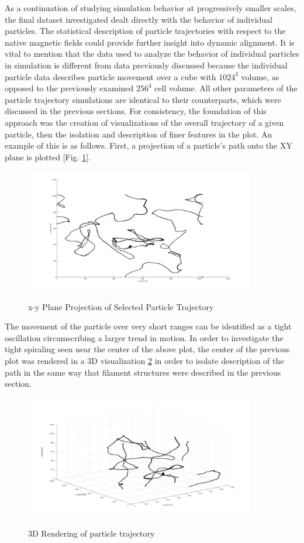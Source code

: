 \documentclass[journal, a4paper]{IEEEtran}
\begin{document}
As a continuation of studying simulation behavior at progressively smaller scales, the final dataset investigated dealt directly with the behavior of individual particles. The statistical description of particle trajectories with respect to the native magnetic fields could provide further insight into dynamic alignment. It is vital to mention that the data used to analyze the behavior of individual particles in simulation is different from data previously discussed because the individual particle data describes particle movement over a cube with $1024^3$ volume, as opposed to the previously examined $256^3$ cell volume. All other parameters of the particle trajectory simulations are identical to their counterparts, which were discussed in the previous sections. For consistency, the foundation of this approach was the creation of visualizations of the overall trajectory of a given particle, then the isolation and description of finer features in the plot. An example of this is as follows. First, a projection of a particle's path onto the XY plane is plotted [Fig. \ref{figure4}].


\begin{figure}[H]
\caption{x-y Plane Projection of Selected Particle Trajectory}
\includegraphics[width=10cm]{representative_2d_particle_trajectory.jpg}
\label{figure4}
\centering
\end{figure}

The movement of the particle over very short ranges can be identified as a tight oscillation circumscribing a larger trend in motion. In order to investigate the tight spiraling seen near the center of the above plot, the center of the previous plot was rendered in a 3D visualization \ref{figure5} in order to isolate description of the path in the same way that filament structures were described in the previous section.

\vspace{.4cm}
\begin{figure}[H]
\caption{3D Rendering of particle trajectory}
\includegraphics[width=10cm]{3d_plot_of_particle_trajectory_subset.jpg}
\label{figure5}
\centering
\vspace{.4cm}
\end{figure}
\end{document}
